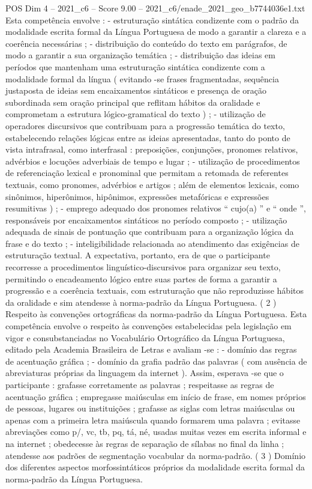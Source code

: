\begin{textsample}{POS Dim 4 – 2021\_c6 – Score 9.00 – 2021\_c6/enade\_2021\_geo\_b7744036e1.txt}
Esta competência envolve : - estruturação sintática condizente com o padrão da modalidade escrita formal da Língua Portuguesa de modo a garantir a clareza e a coerência necessárias ; - distribuição do conteúdo do texto em parágrafos, de modo a garantir a sua organização temática ; - distribuição das ideias em períodos que mantenham uma estruturação sintática condizente com a modalidade formal da língua ( evitando -se frases fragmentadas, sequência justaposta de ideias sem encaixamentos sintáticos e presença de oração subordinada sem oração principal que reflitam hábitos da oralidade e comprometam a estrutura lógico-gramatical do texto ) ; - utilização de operadores discursivos que contribuam para a progressão temática do texto, estabelecendo relações lógicas entre as ideias apresentadas, tanto do ponto de vista intrafrasal, como interfrasal : preposições, conjunções, pronomes relativos, advérbios e locuções adverbiais de tempo e lugar ; - utilização de procedimentos de referenciação lexical e pronominal que permitam a retomada de referentes textuais, como pronomes, advérbios e artigos ; além de elementos lexicais, como sinônimos, hiperônimos, hipônimos, expressões metafóricas e expressões resumitivas ) ; - emprego adequado dos pronomes relativos “ cujo(a) ” e “ onde ”, responsáveis por encaixamentos sintáticos no período composto ; - utilização adequada de sinais de pontuação que contribuam para a organização lógica da frase e do texto ; - inteligibilidade relacionada ao atendimento das exigências de estruturação textual.
A expectativa, portanto, era de que o participante recorresse a procedimentos linguístico-discursivos para organizar seu texto, permitindo o encadeamento lógico entre suas partes de forma a garantir a progressão e a coerência textuais, com estruturação que não reproduzisse hábitos da oralidade e sim atendesse à norma-padrão da Língua Portuguesa. ( 2 ) Respeito às convenções ortográficas da norma-padrão da Língua Portuguesa.
Esta competência envolve o respeito às convenções estabelecidas pela legislação em vigor e consubstanciadas no Vocabulário Ortográfico da Língua Portuguesa, editado pela Academia Brasileira de Letras e avaliam -se : - domínio das regras de acentuação gráfica ; - domínio da grafia padrão das palavras ( com ausência de abreviaturas próprias da linguagem da internet ).
Assim, esperava -se que o participante : grafasse corretamente as palavras ; respeitasse as regras de acentuação gráfica ; empregasse maiúsculas em início de frase, em nomes próprios de pessoas, lugares ou instituições ; grafasse as siglas com letras maiúsculas ou apenas com a primeira letra maiúscula quando formarem uma palavra ; evitasse abreviações como p/, vc, tb, pq, tá, né, usadas muitas vezes em escrita informal e na internet ; obedecesse às regras de separação de sílabas no final da linha ; atendesse aos padrões de segmentação vocabular da norma-padrão. ( 3 ) Domínio dos diferentes aspectos morfossintáticos próprios da modalidade escrita formal da norma-padrão da Língua Portuguesa.

\end{textsample}

